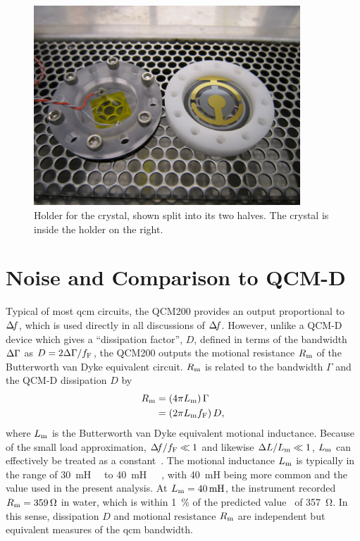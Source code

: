 \begin{figure}[ht]
\centering
\includegraphics[width=10cm,keepaspectratio]{qcm/figures/qcm_holderdiss.jpg}
\caption{Holder for the crystal, shown split into its two halves.  The
crystal is inside the holder on the right.}
\label{fig:cfqcmholder}
\end{figure}

\section{Noise and Comparison to QCM-D}\label{sec:suppqcmdcomp}
Typical of most \gls{qcm} circuits, the QCM200 provides an output proportional to
$\Delta\!f$, which is used directly in all discussions of $\Delta\!f$.  However, unlike
a QCM-D device which gives a ``dissipation factor'', $D$, defined in
terms of the bandwidth $\Delta\Gamma$ as $D=2\Delta\Gamma/f_\mathrm{F}$, the QCM200
outputs the motional resistance $R_\mathrm{m}$ of the Butterworth van Dyke
equivalent circuit.  $R_\mathrm{m}$ is related to
the bandwidth $\Gamma$ and the QCM-D dissipation $D$ by
\begin{align}
 R_\mathrm{m}&=\left(4 \pi L_\mathrm{m}\right) \Gamma\\
 &=\left(2 \pi L_\mathrm{m} f_\mathrm{F}\right) D,
\end{align}
where $L_\mathrm{m}$ is the Butterworth van Dyke equivalent motional inductance.
Because of the small load approximation, $\Delta\!f/f_\mathrm{F} \ll 1$ and
likewise $\Delta L/L_\mathrm{m} \ll 1$, $L_\mathrm{m}$ can effectively be treated as a
constant~\cite{geelhood2002transient}.  The motional inductance $L_\mathrm{m}$ is
typically in the range of
\SI{30}{\milli\henry}~\cite{srsqcm200manual}~\cite{hussain2005ots} to
\SI{40}{\milli\henry}~\cite{gottschling2000detection}~\cite{arnau2002circuit}~\cite{snellings2001response},
with \SI{40}{\milli\henry} being more common and the value used in the
present analysis.  At $\Lm=\SI{40}{\milli\henry}$, the instrument recorded
$R_\mathrm{m}=\SI{359}{\ohm}$ in water, which is within \SI{1}{\percent} of the
predicted value~\cite{kanazawa1985frequency} of \SI{357}{\ohm}.  In this
sense, dissipation $D$ and motional resistance $R_\mathrm{m}$ are independent but
equivalent measures of the \gls{qcm} bandwidth.

